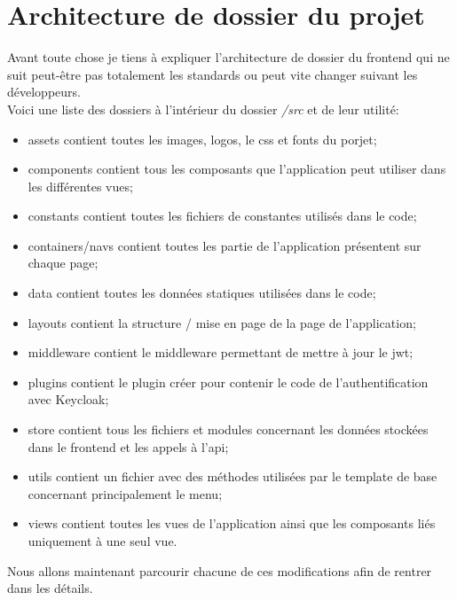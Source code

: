 \documentclass[
    iai, %
    il, %
]{heig-tb}
\begin{document}
\section{Architecture de dossier du projet}
Avant toute chose je tiens à expliquer l'architecture de dossier du \Gls{frontend} qui ne suit peut-être pas totalement les standards ou peut vite changer suivant les développeurs. \\
Voici une liste des dossiers à l'intérieur du dossier \emph{/src} et de leur utilité:
\begin{itemize}
    \item assets contient toutes les images, logos, le css et fonts du porjet;
    \item components contient tous les composants que l'application peut utiliser dans les différentes vues;
    \item constants contient toutes les fichiers de constantes utilisés dans le code;
    \item containers/navs contient toutes les partie de l'application présentent sur chaque page;
    \item data contient toutes les données statiques utilisées dans le code;
    \item layouts contient la structure / mise en page de la page de l'application;
    \item middleware contient le middleware permettant de mettre à jour le \Gls{jwt};
    \item plugins contient le plugin créer pour contenir le code de l'authentification avec Keycloak;
    \item store contient tous les fichiers et modules concernant les données stockées dans le \Gls{frontend} et les appels à l'\Gls{api};
    \item utils contient un fichier avec des méthodes utilisées par le template de base concernant principalement le menu;
    \item views contient toutes les vues de l'application ainsi que les composants liés uniquement à une seul vue.
\end{itemize}

Nous allons maintenant parcourir chacune de ces modifications afin de rentrer dans les détails.
\end{document}

